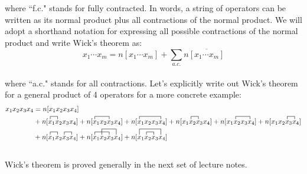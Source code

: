 \documentclass{article}
\newcommand{\ol}{\overline}
\newcommand{\ctr}{\contraction}
\newcommand{\cd}{\ensuremath{\cdots} }
\begin{document}
where ``f.c." stands for fully contracted. 
In words, a string of operators can be written as its normal product plus all contractions of the normal product. 
We will adopt a shorthand notation for expressing all possible contractions of the normal product and write Wick's theorem as: 
\[x_1 \cd x_m = n[x_1 \cd x_m ]  + \sum_{a.c.} n\ol{[x_1 \cd x_m ]} \]\\
where ``a.c." stands for all contractions.
Let's explicitly write out Wick's theorem for a general product of 4 operators for a more concrete example: 
\begin{align*}
x_1x_2x_3x_4 &= n[x_1x_2x_3x_4 ] \\ 
&+n[ \ctr{}{x}{{}_1}{x} x_1x_2x_3x_4 ] + n[ \ctr{}{x}{{}_1x_2}{x} x_1x_2x_3x_4 ] + n[ \ctr{}{x}{{}_1x_2 x_3}{x} x_1x_2x_3x_4 ] 
+ n[ \ctr{x_1}{x}{{}_2}{x} x_1x_2x_3x_4 ] +  n[ \ctr{x_1}{x}{{}_2 x_3}{x} x_1x_2x_3x_4 ] + n[ \ctr{x_1 x_2}{x}{{}_3}{x} x_1x_2x_3x_4 ] \\
&+ n[ \ctr{}{x}{{}_1}{x}  \ctr{x_1 x_2}{x}{{}_3}{x} x_1x_2x_3x_4 ]
+ n[ \ctr{}{x}{{}_1x_2}{x}  \ctr[2ex]{x_1}{x}{{}_2 x_3}{x} x_1x_2x_3x_4 ] 
+ n[ \ctr{x_1}{x}{{}_2}{x} \ctr[2ex]{}{x}{{}_1x_2 x_3}{x}      x_1x_2x_3x_4 ] 
\end{align*}
\\
Wick's theorem is proved generally in the next set of lecture notes.
\end{document}

